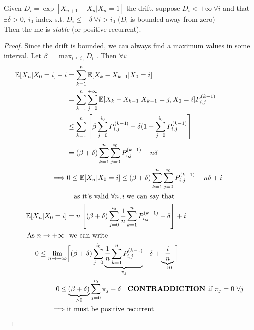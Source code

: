 \begin{lemma}

	Given $D_i = \exp[X_{n+1}-X_n|X_n = 1]$ the drift, suppose $D_i < +\infty ~\forall i$ and that $\exists \delta > 0 , ~i_0$ index s.t.
	$D_i \le - \delta ~\forall i > i_0$ ($D_i$ is bounded away from zero)\\
	Then the \gls{mc} is \emph{stable} (or positive recurrent).

\end{lemma}
\begin{proof}
	Since the drift is bounded, we can always find a maximum values in some interval.
 Let $\beta = \max_{i \le i_0} D_i$ . Then $\forall i$:
 \begin{equation}\begin{split}
	\exp[X_n | X_0 = i] -i &= \sum\limits_{k=1}^n \exp[X_k - X_{k-1}|X_0 = i] \\
	&= \sum\limits_{k=1}^n \sum\limits_{j=0}^{+\infty} \exp[X_k - X_{k-1}|X_{k-1} = j , X_0 = i ] P_{i,j}^{(k-1)}\\
	& \le \sum\limits_{k=1}^{n} \left[\beta \sum\limits_{j=0}^{i_0} P_{i,j}^{(k-1)} - \delta (1- \sum\limits_{j=0}^{i_0} P_{i,j}^{(k-1)}\right]\\
	&= (\beta + \delta) \sum\limits_{k=1}^n \sum\limits_{j=0}^{i_0} P_{i,j}^{(k-1)} - n \delta \\
	\implies & 0 \le \exp[X_n | X_0 = i] \le (\beta + \delta) \sum\limits_{k=1}^n \sum\limits_{j=0}^{i_0} P_{i,j}^{(k-1)} - n \delta +i\\
	& \quad \text{as it's valid $\forall n , i$ we can say that} \\
	\exp[X_n | X_0 = i] &= n \left[(\beta + \delta) \sum\limits_{j=0}^{i_0} \frac{1}{n} \sum\limits_{k=1}^{n} P_{i,j}^{(k-1)} - \delta \right] +i\\
	\text{As $n \to +\infty$ } & \text{ we can write}\\
	0 \le \lim_{n \to +\infty} &\bigg[(\beta + \delta) \sum\limits_{j=0}^{i_0} \underbrace {\frac{1}{n} \sum\limits_{k=1}^{n} P_{i,j}^{(k-1)}}_{\pi_j} - \delta + \underbrace{\frac{i}{n}}_{\to 0}\bigg]\\
	0 \le &\underbrace{(\beta + \delta)}_{>0} \sum\limits_{j=0}^{i_0} \pi_j - \delta \quad \text{\textbf{CONTRADDICTION }if } \pi_j = 0 ~\forall j \\
	\implies & \text{it must be positive recurrent}
	\end{split}\end{equation}
\end{proof}

